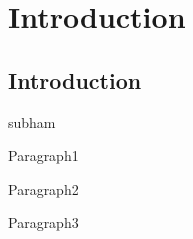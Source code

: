 
\chapter{Introduction} %

\label{c1} %


\section{Introduction}

subham \cite{kumar2024multi}
\par Paragraph1
\par Paragraph2
\par Paragraph3
